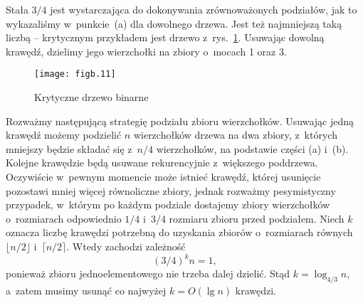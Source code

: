 \subproblem %
Stała $3/4$ jest wystarczająca do dokonywania zrównoważonych podziałów, jak to wykazaliśmy w~punkcie~(a) dla dowolnego drzewa. Jest też najmniejszą taką liczbą -- krytycznym przykładem jest drzewo z~rys.~\ref{fig:B-3b}. Usuwając dowolną krawędź, dzielimy jego wierzchołki na zbiory o~mocach 1 oraz 3.
\begin{figure}[ht]
	\begin{center}
		\texttt{[image: figb.11]}
	\end{center}
	\caption{Krytyczne drzewo binarne} \label{fig:B-3b}
\end{figure}

\subproblem %
Rozważmy następującą strategię podziału zbioru wierzchołków. Usuwając jedną krawędź możemy podzielić $n$ wierzchołków drzewa na dwa zbiory, z~których mniejszy będzie składać się z~$n/4$ wierzchołków, na podstawie części (a) i~(b). Kolejne krawędzie będą usuwane rekurencyjnie z~większego poddrzewa. Oczywiście w~pewnym momencie może istnieć krawędź, której usunięcie pozostawi mniej więcej równoliczne zbiory, jednak rozważmy pesymistyczny przypadek, w~którym po każdym podziale dostajemy zbiory wierzchołków o~rozmiarach odpowiednio $1/4$ i~$3/4$ rozmiaru zbioru przed podziałem. Niech $k$ oznacza liczbę krawędzi potrzebną do uzyskania zbiorów o~rozmiarach równych $\lfloor n/2\rfloor$ i~$\lceil n/2\rceil$. Wtedy zachodzi zależność
\[
    (3/4)^kn = 1,
\]
ponieważ zbioru jednoelementowego nie trzeba dalej dzielić. Stąd $k=\log_{4/3}n$, a~zatem musimy usunąć co najwyżej $k=O(\lg n)$ krawędzi.

\endinput
